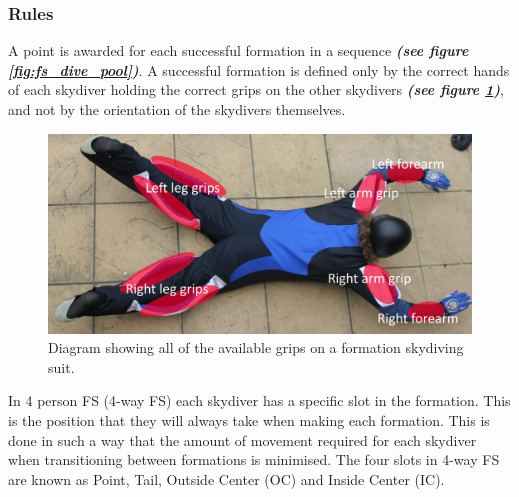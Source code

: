 \documentclass[a4paper, 12pt]{article}
\begin{document}
		\subsubsection{Rules}
		A point is awarded for each successful formation in a sequence \textbf{\emph{(see figure \ref{fig:fs_dive_pool})}}. A successful formation is defined only by the correct hands of each skydiver holding the correct grips on the other skydivers \textbf{\emph{(see figure \ref{fig:grips})}}, and not by the orientation of the skydivers themselves.
%
\begin{figure}[H]
	\centering
	\includegraphics[width=0.9\linewidth]{grips.png}
	\caption{Diagram showing all of the available grips on a formation skydiving suit.}
	\label{fig:grips}
\end{figure}
%
\noindent In 4 person FS (4-way FS) each skydiver has a specific slot in the formation. This is the position that they will always take when making each formation. This is done in such a way that the amount of movement required for each skydiver when transitioning between formations is minimised. The four slots in 4-way FS are known as Point, Tail, Outside Center (OC) and Inside Center (IC). 
%
\end{document}
